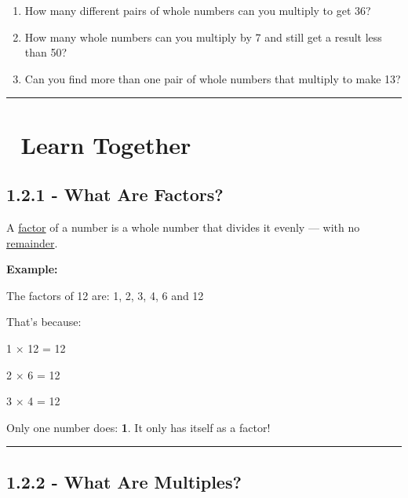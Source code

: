 \documentclass[
  letterpaper,
  DIV=11,
  numbers=noendperiod]{scrreprt}
\begin{document}

\begin{enumerate}
\def\labelenumi{\arabic{enumi}.}
\item
  How many different pairs of whole numbers can you multiply to get 36?
\item
  How many whole numbers can you multiply by 7 and still get a result
  less than 50?
\item
  Can you find more than one pair of whole numbers that multiply to make
  13?
\end{enumerate}

\begin{center}\rule{0.5\linewidth}{0.5pt}\end{center}

\section*{👥 Learn Together}\label{learn-together-1}


\subsection*{1.2.1 - What Are Factors?}\label{what-are-factors}

A \href{./glossary.html\#glossary-factor}{factor} of a number is a whole
number that divides it evenly --- with no
\href{./glossary.html\#glossary-remainder}{remainder}.

\textbf{Example:}

The factors of 12 are: 1, 2, 3, 4, 6 and 12

That's because:

1 × 12 = 12

2 × 6 = 12

3 × 4 = 12

Only one number does: \textbf{1}. It only has itself as a factor!

\begin{center}\rule{0.5\linewidth}{0.5pt}\end{center}

\subsection*{1.2.2 - What Are Multiples?}\label{what-are-multiples}
\end{document}

